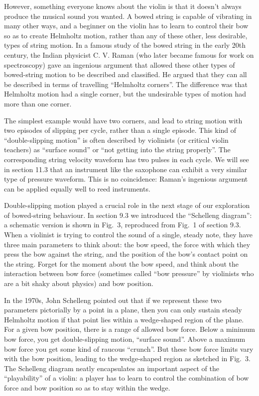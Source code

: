   However, something everyone knows about the violin is that it doesn’t always 
  produce the musical sound you wanted. A bowed string is capable of vibrating 
  in many other ways, and a beginner on the violin has to learn to control 
  their bow so as to create Helmholtz motion, rather than any of these other, 
  less desirable, types of string motion. In a famous study of the bowed string 
  in the early 20th century, the Indian physicist C. V. Raman (who later became 
  famous for work on spectroscopy) gave an ingenious argument that allowed 
  these other types of bowed-string motion to be described and classified. He 
  argued that they can all be described in terms of travelling “Helmholtz 
  corners”. The difference was that Helmholtz motion had a single corner, but 
  the undesirable types of motion had more than one corner. 

  The simplest example would have two corners, and lead to string motion with 
  two episodes of slipping per cycle, rather than a single episode. This kind 
  of “double-slipping motion” is often described by violinists (or critical 
  violin teachers) as “surface sound” or “not getting into the string 
  properly”. The corresponding string velocity waveform has two pulses in each 
  cycle. We will see in section 11.3 that an instrument like the saxophone can 
  exhibit a very similar type of pressure waveform. This is no coincidence: 
  Raman’s ingenious argument can be applied equally well to reed instruments. 

  Double-slipping motion played a crucial role in the next stage of our 
  exploration of bowed-string behaviour. In section 9.3 we introduced the 
  “Schelleng diagram”: a schematic version is shown in Fig.\ 3, reproduced from 
  Fig.\ 1 of section 9.3. When a violinist is trying to control the sound of a 
  single, steady note, they have three main parameters to think about: the bow 
  speed, the force with which they press the bow against the string, and the 
  position of the bow’s contact point on the string. Forget for the moment 
  about the bow speed, and think about the interaction between bow force 
  (sometimes called “bow pressure” by violinists who are a bit shaky about 
  physics) and bow position. 

  In the 1970s, John Schelleng pointed out that if we represent these two 
  parameters pictorially by a point in a plane, then you can only sustain 
  steady Helmholtz motion if that point lies within a wedge-shaped region of 
  the plane. For a given bow position, there is a range of allowed bow force. 
  Below a minimum bow force, you get double-slipping motion, “surface sound”. 
  Above a maximum bow force you get some kind of raucous “crunch”. But these 
  bow force limits vary with the bow position, leading to the wedge-shaped 
  region as sketched in Fig.\ 3. The Schelleng diagram neatly encapsulates an 
  important aspect of the “playability” of a violin: a player has to learn to 
  control the combination of bow force and bow position so as to stay within 
  the wedge. 

